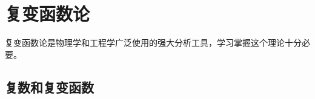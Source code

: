 

\chapter{复变函数论}
\label{chap:complexfunctions}
复变函数论是物理学和工程学广泛使用的强大分析工具，学习掌握这个理论十分必要。

\section{复数和复变函数}

